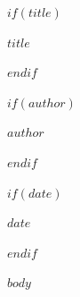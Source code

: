 \documentclass[12pt]{article}
\begin{document}
$if(title)$
\begin{center}
{\headingfont\Huge $title$}
\end{center}
$endif$

$if(author)$
{\headingfont\Large $author$\par}
$endif$

$if(date)$
{\large $date$\par}
$endif$

$body$
\end{document}
